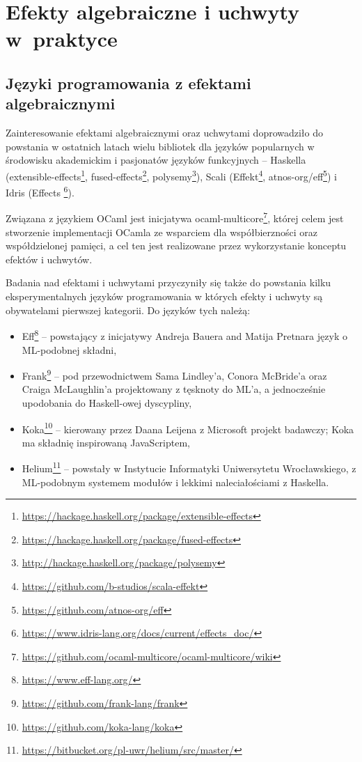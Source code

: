 
\chapter{Efekty algebraiczne i uchwyty w~praktyce}

\section{Języki programowania z efektami algebraicznymi}

Zainteresowanie efektami algebraicznymi oraz uchwytami doprowadziło do powstania w ostatnich latach wielu bibliotek dla języków popularnych w środowisku akademickim i pasjonatów języków funkcyjnych -- Haskella (extensible-effects\footnote{\url{https://hackage.haskell.org/package/extensible-effects}},
fused-effects\footnote{\url{https://hackage.haskell.org/package/fused-effects}},
polysemy\footnote{\url{http://hackage.haskell.org/package/polysemy}}), Scali
(Effekt\footnote{\url{https://github.com/b-studios/scala-effekt}},
atnos-org/eff\footnote{\url{https://github.com/atnos-org/eff}})
i Idris (Effects \footnote{\url{https://www.idris-lang.org/docs/current/effects_doc/}}).

Związana z językiem OCaml jest inicjatywa ocaml-multicore\footnote{\url{https://github.com/ocaml-multicore/ocaml-multicore/wiki}}, której celem jest stworzenie implementacji OCamla ze wsparciem dla współbierzności oraz współdzielonej pamięci, a cel ten jest realizowane przez wykorzystanie konceptu efektów i uchwytów.

Badania nad efektami i uchwytami przyczyniły się także do powstania kilku eksperymentalnych języków programowania w których efekty i uchwyty są obywatelami pierwszej kategorii. Do języków tych należą:
\begin{itemize}
\item Eff\footnote{\url{https://www.eff-lang.org/}} -- powstający z inicjatywy Andreja Bauera and Matija Pretnara język o ML-podobnej składni,
\item Frank\footnote{\url{https://github.com/frank-lang/frank}} \cite{DBLP:journals/corr/LindleyMM16} -- pod przewodnictwem Sama Lindley'a, Conora McBride'a oraz Craiga McLaughlin'a projektowany z tęsknoty do ML'a, a jednocześnie upodobania do Haskell-owej dyscypliny,
\item Koka\footnote{\url{https://github.com/koka-lang/koka}} -- kierowany przez Daana Leijena z Microsoft projekt badawczy; Koka ma składnię inspirowaną JavaScriptem,
\item Helium\footnote{\url{https://bitbucket.org/pl-uwr/helium/src/master/}} \cite{biernacki2019abstracting} -- powstały w Instytucie Informatyki Uniwersytetu Wrocławskiego, z ML-podobnym systemem modułów i lekkimi naleciałościami z Haskella.
\end{itemize}

